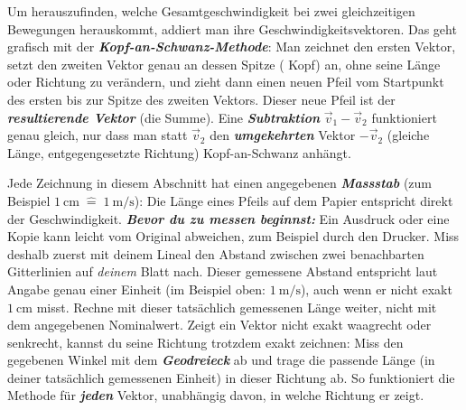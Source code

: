 \documentclass[addpoints,11pt,a4paper]{exam}
\begin{document}
\begin{theoriebox}
Um herauszufinden, welche Gesamtgeschwindigkeit bei zwei gleichzeitigen
Bewegungen herauskommt, addiert man ihre Geschwindigkeitsvektoren. Das geht
grafisch mit der \textbf{\emph{Kopf-an-Schwanz-Methode}}: Man zeichnet den
ersten Vektor, setzt den zweiten Vektor genau an dessen Spitze (\glqq
Kopf\grqq{}) an, ohne seine Länge oder Richtung zu verändern, und zieht dann
einen neuen Pfeil vom Startpunkt des ersten bis zur Spitze des zweiten
Vektors. Dieser neue Pfeil ist der \textbf{\emph{resultierende Vektor}} (die
Summe). Eine \textbf{\emph{Subtraktion}} $\vec{v}_1-\vec{v}_2$ funktioniert
genau gleich, nur dass man statt $\vec{v}_2$ den \textbf{\emph{umgekehrten}}
Vektor $-\vec{v}_2$ (gleiche Länge, entgegengesetzte Richtung)
Kopf-an-Schwanz anhängt.

\begin{hinweisbox}
Jede Zeichnung in diesem Abschnitt hat einen angegebenen
\textbf{\emph{Massstab}} (zum Beispiel $\SI{1}{\centi\meter}\;\widehat{=}\;
\SI{1}{\meter\per\second}$): Die Länge eines Pfeils auf dem Papier
entspricht direkt der Geschwindigkeit. \textbf{\emph{Bevor du zu messen
beginnst:}} Ein Ausdruck oder eine Kopie kann leicht vom Original
abweichen, zum Beispiel durch den Drucker. Miss deshalb zuerst mit deinem
Lineal den Abstand zwischen zwei benachbarten Gitterlinien auf
\emph{deinem} Blatt nach. Dieser gemessene Abstand entspricht laut Angabe
genau einer Einheit (im Beispiel oben: $\SI{1}{\meter\per\second}$), auch
wenn er nicht exakt $\SI{1}{\centi\meter}$ misst. Rechne mit dieser
tatsächlich gemessenen Länge weiter, nicht mit dem angegebenen
Nominalwert. Zeigt ein Vektor nicht exakt waagrecht oder senkrecht, kannst
du seine Richtung trotzdem exakt zeichnen: Miss den gegebenen Winkel mit
dem \textbf{\emph{Geodreieck}} ab und trage die passende Länge (in deiner
tatsächlich gemessenen Einheit) in dieser Richtung ab. So funktioniert die
Methode für \textbf{\emph{jeden}} Vektor, unabhängig davon, in welche
Richtung er zeigt.
\end{hinweisbox}


\end{theoriebox}
\end{document}
